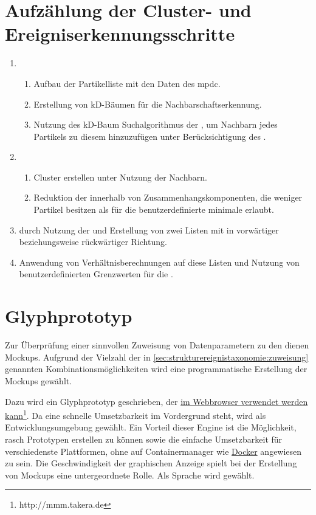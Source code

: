 \section{Aufzählung der Cluster- und Ereigniserkennungsschritte}\label{sec:cluster-ereignis-schritte}

\begin{enumerate}
	\item
	\begin{enumerate}
		\item Aufbau der Partikelliste mit den Daten des \gls{mpdc}.
		\item Erstellung von kD-Bäumen für die Nachbarschaftserkennung.
		\item Nutzung des kD-Baum Suchalgorithmus der \ANN, um Nachbarn jedes Partikels zu diesem hinzuzufügen unter Berücksichtigung des .
	\end{enumerate}
	\item
	\begin{enumerate}
		\item Cluster erstellen unter Nutzung der Nachbarn.
		\item Reduktion der  innerhalb von Zusammenhangskomponenten, die weniger Partikel besitzen als für die benutzerdefinierte minimale  erlaubt.
	\end{enumerate}
	\item \SECC durch Nutzung der  und Erstellung von zwei Listen mit  in vorwärtiger beziehungsweise rückwärtiger Richtung.
	\item Anwendung von Verhältnisberechnungen auf diese Listen und Nutzung von benutzerdefinierten Grenzwerten für die .
\end{enumerate}

\section{Glyphprototyp}\label{sec:glyphprototyp}
Zur Überprüfung einer sinnvollen Zuweisung von Datenparametern zu den  dienen Mockups. Aufgrund der Vielzahl der in \autoref{sec:strukturereignistaxonomie:zuweisung} genannten Kombinationsmöglichkeiten wird eine programmatische Erstellung der Mockups gewählt.

Dazu wird ein Glyphprototyp geschrieben, der \href{http://mmm.takera.de}{im Webbrowser verwendet werden kann}\footnote{http://mmm.takera.de}. Da eine schnelle Umsetzbarkeit im Vordergrund steht, wird  als Entwicklungsumgebung gewählt. Ein Vorteil dieser Engine ist die Möglichkeit, rasch Prototypen erstellen zu können sowie die einfache Umsetzbarkeit für verschiedenste Plattformen, ohne auf Containermanager wie \href{https://www.docker.com/}{Docker} angewiesen zu sein.
Die Geschwindigkeit der graphischen Anzeige spielt bei der Erstellung von Mockups eine untergeordnete Rolle. Als Sprache wird  gewählt.

